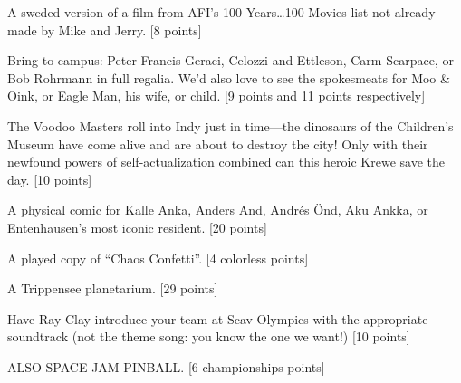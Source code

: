\documentclass{book}
\begin{document}
\begin{list}{}{}
\item A sweded version of a film from AFI's 100 Years\ldots100 Movies list not already made by Mike and Jerry.  [8 points]

\item Bring to campus: Peter Francis Geraci, Celozzi and Ettleson,  Carm Scarpace, or Bob Rohrmann in full regalia. We'd also love to see the spokesmeats for Moo \& Oink, or Eagle Man, his wife, or child. [9 points and 11 points respectively]

\item The Voodoo Masters roll into Indy just in time---the dinosaurs of the Children's Museum have come alive and are about to destroy the city! Only with their newfound powers of self-actualization combined can this heroic Krewe save the day. [10 points]

\setcounter{items}{313}

\item A physical comic for Kalle Anka, Anders And, Andr\'{e}s \"{O}nd, Aku Ankka, or Entenhausen's most iconic resident. [20 points]

\item A played copy of ``Chaos Confetti''. [4 colorless points]

\item A Trippensee planetarium. [29 points]

\item Have Ray Clay introduce your team at Scav Olympics with the appropriate soundtrack (not the theme song: you know the one we want!) [10 points]

\item  ALSO SPACE JAM PINBALL. [6 championships points]



\newpage


\end{list}
\end{document}
